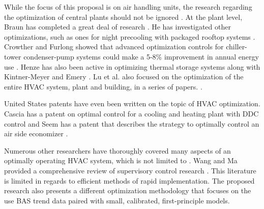 While the focus of this proposal is on air handling units, the research
regarding the optimization of central plants should not be ignored
\cite{Ahn2001, Yu2008OptimizingChillers}. At the plant level, Braun has
completed a great deal of research \cite{braun1990, Braun2007RP1252,
Braun2007HybridCooling, Braun2007GeneralControl}. He has investigated
other optimizations, such as ones for night precooling with packaged
rooftop systems \cite{Braun2005}. Crowther and Furlong showed that
advanced optimization controls for chiller-tower condenser-pump systems
could make a 5-8\% improvement in annual energy use
\cite{Crowther2004}. Henze has also been active in
optimizing thermal storage systems \cite{Henze2005} along with
Kintner-Meyer and Emery \cite{KintnerMeyer1995}. Lu et al. also focused
on the optimization of the entire HVAC system, plant and building, in a
series of papers. \cite{LuLu2004, LuLu2005Part1, LuLu2005Part2,
LuLu2005HVACSystemOptimization}. 

United States patents have even been written on the topic of HVAC
optimization. Cascia has a patent on optimal control for a cooling and
heating plant with DDC control \cite{Cascia1999} and Seem has a patent
that describes the strategy to optimally control an air side economizer
\cite{Seem2002}. 

Numerous other researchers have thoroughly covered many aspects of an
optimally operating HVAC system, which is not limited to
\cite{Gruber2014AlternativeBuildings,Cho2009Single-ductOptimization,Nassif2005,Zaheer-uddin2000OptimalBuildings,Wang2000Model-basedAlgorithm,Henze2003EvaluationSystems,Liu2006ExperimentalFoundation,
Zheng1996,
Ning2010Neuro-optimalSystem,Atthajariyakul2004,Cui2004,XuXinhua2009,SunZhongwei2011,Mumma1997EnergyControl,Mossolly-Ghali-Ghaddar_2009_Energy}.
Wang and Ma provided a comprehensive review of supervisory control
research \cite{Wang2008}. This literature is limited in
regards to efficient methods of rapid implementation. The proposed
research also presents a different optimization methodology that focuses
on the use BAS trend data paired with small, calibrated, first-principle
models. 











